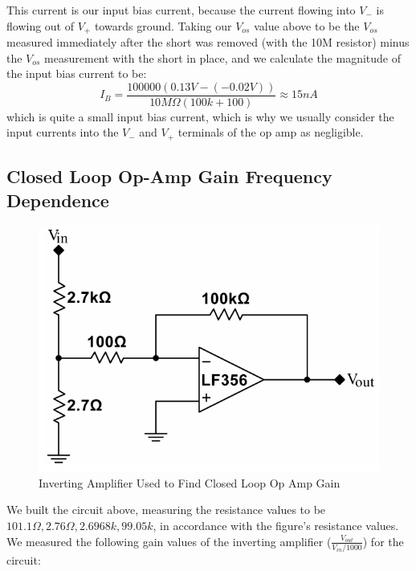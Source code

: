 \documentclass{article}
\begin{document}
    This current is our input bias current, because the current flowing into $V_-$ is flowing out of $V_+$ towards ground. Taking our $V_{os}$ value above to be the $V_{os}$ measured immediately after the short was removed (with the 10M resistor) minus the $V_{os}$ measurement with the short in place, and we calculate the magnitude of the input bias current to be:
    \begin{equation}
        I_B = \frac{100000 (0.13V - (-0.02V))}{10M\Omega(100k + 100)} \approx 15 nA
    \end{equation}
    which is quite a small input bias current, which is why we usually consider the input currents into the $V_-$ and $V_+$ terminals of the op amp as negligible.

\subsection{Closed Loop Op-Amp Gain Frequency Dependence}
    \begin{figure}[H]
        \centering
        \includegraphics[scale = 0.5]{4.png}
        \caption{Inverting Amplifier Used to Find Closed Loop Op Amp Gain \cite{lab8}}
        \label{fig:my_label}
    \end{figure}
    We built the circuit above, measuring the resistance values to be $101.1\Omega, 2.76\Omega, 2.6968k, 99.05k$, in accordance with the figure's resistance values. We measured the following gain values of the inverting amplifier ($\frac{V_{out}}{V_{in}/1000}$) for the circuit:
\end{document}
